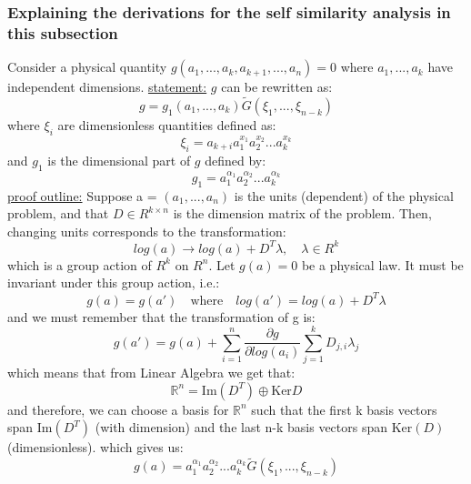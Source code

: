 \documentclass{article}
\begin{document}
\subsubsection{Explaining the derivations for the self similarity analysis in this subsection}
Consider a physical quantity $g(a_1,...,a_k,a_{k+1},...,a_n) = 0$ where $a_1,...,a_k$ have independent dimensions.
\underline{statement:} $g$ can be rewritten as:
\begin{equation}
    g = g_1 (a_1,...,a_k) \tilde{G}(\xi_1,...,\xi_{n-k}) 
\end{equation}
where $\xi_i$ are dimensionless quantities defined as:
\begin{equation}
    \xi_i = a_{k+i} a_1^{x_1} a_2^{x_2} ... a_k^{x_k}
\end{equation}
and $g_1$ is the dimensional part of $g$ defined by:
\begin{equation}
    g_1 = a_1^{\alpha_1} a_2^{\alpha_2} ... a_k^{\alpha_k}
\end{equation}
\underline{proof outline:} Suppose a = $(a_1,...,a_n)$ is the units (dependent) of the physical problem, and that
$D\in R^{k \times n}$ is the dimension matrix of the problem. Then, changing units corresponds to the transformation:
\begin{equation}
    log(a) \to log(a) + D^T \lambda, \quad \lambda \in R^k
\end{equation}
which is a group action of $R^k$ on $R^n$. Let $g(a) = 0$ be a physical law. It must be invariant under this group action, i.e.:
\begin{equation}
    g(a) = g(a') \quad \text{where} \quad log(a') = log(a) + D^T \lambda
\end{equation}
and we must remember that the transformation of g is:
\begin{equation}
    g(a') = g(a) + \sum_{i=1}^n \frac{\partial g}{\partial log(a_i)} \sum_{j=1}^k D_{j,i} \lambda_j
\end{equation}
which means that from Linear Algebra we get that:
\begin{equation}
    \mathbb{R}^n = \text{Im}(D^T) \oplus \text{Ker}D
\end{equation}
and therefore, we can choose a basis for $\mathbb{R}^n$ such that the first k basis vectors span Im$(D^T)$ (with dimension) and the last n-k basis vectors span Ker$(D)$ (dimensionless).
which gives us:
\begin{equation}
    g(a) = a_1^{\alpha_1} a_2^{\alpha_2} ... a_k^{\alpha_k} \tilde{G}(\xi_1,...,\xi_{n-k})
\end{equation}
\end{document}
